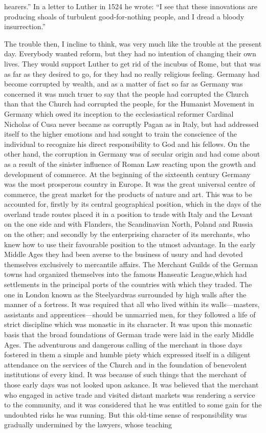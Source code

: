 \documentclass{book}
\begin{document}
hearers.” In a letter to Luther in 1524 he wrote: “I see that these innovations are producing shoals of turbulent good-for-nothing people, and I dread a bloody insurrection.”\footnotemark[3]

The trouble then, I incline to think, was very much like the trouble at the present day. Everybody wanted reform, but they had no intention of changing their own lives. They would support Luther to get rid of the incubus of Rome, but that was as far as they desired to go, for they had no really religious feeling. Germany had become corrupted by wealth, and as a matter of fact so far as Germany was concerned it was much truer to say that the people had corrupted the Church than that the Church had corrupted the people, for the Humanist Movement in Germany which owed its inception to the ecclesiastical reformer Cardinal Nicholas of Cusa never became as corruptly Pagan as in Italy, but had addressed itself to the higher emotions and had sought to train the conscience of the individual to recognize his direct responsibility to God and his fellows. On the other hand, the corruption in Germany was of secular origin and had come about as a result of the sinister influence of Roman Law reacting upon the growth and development of commerce. At the beginning of the sixteenth century Germany was the most prosperous country in Europe. It was the great universal centre of commerce, the great market for the products of nature and art. This was to be accounted for, firstly by its central geographical position, which in the days of the overland trade routes placed it in a position to trade with Italy and the Levant on the one side and with Flanders, the Scandinavian North, Poland and Russia on the other; and secondly by the enterprising character of its merchants, who knew how to use their favourable position to the utmost advantage. In the early Middle Ages they had been averse to the business of usury and had devoted themselves exclusively to mercantile affairs. The Merchant Guilds of the German towns had organized themselves into the famous Hanseatic League,\footnotemark[4] which had settlements in the principal ports of the countries with which they traded. The one in London known as the Steelyard\footnotemark[5] was surrounded by high walls after the manner of a fortress. It was required that all who lived within its walls—masters, assistants and apprentices—should be unmarried men, for they followed a life of strict discipline which was monastic in its character. It was upon this monastic basis that the broad foundations of German trade were laid in the early Middle Ages. The adventurous and dangerous calling of the merchant in those days fostered in them a simple and humble piety which expressed itself in a diligent attendance on the services of the Church and in the foundation of benevolent institutions of every kind. It was because of such things that the merchant of those early days was not looked upon askance. It was believed that the merchant who engaged in active trade and visited distant markets was rendering a service to the community, and it was considered that he was entitled to some gain for the undoubted risks he was running. But this old-time sense of responsibility was gradually undermined by the lawyers, whose teaching 
\end{document}
